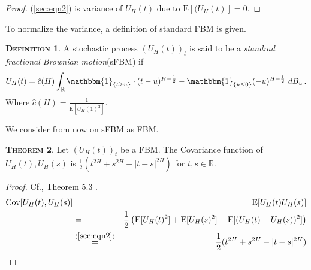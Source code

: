 \documentclass[a4paper, twoside, 11pt]{article}
\theoremstyle{definition}
\newtheorem{definition}{\scshape Definition}[section]
\newtheorem{theorem}[definition]{\scshape Theorem}
\newcommand{\brkt}[1]{\left({#1} \right)}
\begin{document}
\begin{proof}
  (\ref{sec:eqn2}) is variance of $U_H(t)$ due to $\mathrm{E}[(U_H(t)] = 0$.
\end{proof}
To normalize the variance, a definition of standard FBM is given.

\begin{definition}
  A stochastic process $(U_H(t))_{t}$ is said to be a \emph{standrad fractional Brownian motion}(sFBM) if
  \begin{equation}
U_H(t) = \hat{c}(H) \int_{\mathbb{R}} \mathbbm{1}_{\{t\ge u\}}\cdot (t-u)^{H-\frac{1}{2}} - \mathbbm{1}_{\{u\le 0\}} (-u)^{H-\frac{1}{2}} \, \mathop{dB_u}.
\label{sec:eqn3}
\end{equation}
Where $\hat{c}(H) = \frac{1}{\mathrm{E}[U_H(1)^2]} $.
\end{definition}
We consider from now on sFBM as FBM.

\begin{theorem}
  Let  $(U_H(t))_{t}$ be a FBM. The Covariance function of $U_H(t), U_H(s)$ is $ \frac{1}{2}(t^{2H} + s^{2H} - |t-s|^{2H})$ for $t, s \in \mathbb{R}$.
\end{theorem}

\begin{proof}
  Cf.\cite{mandelbrot}, Theorem 5.3 .
  \begin{eqnarray}
	\mathrm{Cov}[U_H(t), U_H(s)] &=& \mathrm{E}[U_H(t)U_H(s)] \nonumber\\
	&=& \frac{1}{2}\brkt{\mathrm{E}[U_H(t)^2] + \mathrm{E}[U_H(s)^2] - \mathrm{E}[(U_H(t) - U_H(s))^2]} \nonumber\\
	&\overset{(\ref{sec:eqn2})}{=}& \frac{1}{2}(t^{2H} + s^{2H} - |t-s|^{2H})
	\label{sec:eqn4}
  \end{eqnarray}
\end{proof}
\end{document}
